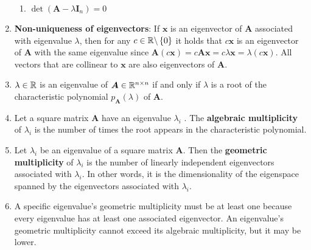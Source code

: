 \begin{enumerate}
\begin{enumerate}
        \item $\det(\bm{A} - \lambda \bm{I}_n) = 0$
        \hfill \cite{mfml/book/mml/Deisenroth-Faisal-Ong}
    \end{enumerate}

    \item \textbf{Non-uniqueness of eigenvectors}: If $\bm{x}$ is an eigenvector of $\bm{A}$ associated with eigenvalue $\lambda$, then for any $c \in \mathbb{R}\backslash \left\{0\right\}$ it holds that $c\bm{x}$ is an eigenvector of $\bm{A}$ with the same eigenvalue since $\bm{A}(c\bm{x}) = c\bm{Ax} = c\lambda\bm{x} = \lambda(c\bm{x})$. All vectors that are collinear to $\bm{x}$ are also eigenvectors of $\bm{A}$.
    \hfill \cite{mfml/book/mml/Deisenroth-Faisal-Ong}

    \item
    \begin{theorem}
        $\lambda  \in \mathbb{R}$ is an eigenvalue of $\bm{A} \in \mathbb{R}^{n\times n}$ if and only if $\lambda$  is a root of the characteristic polynomial $p_{\bm{A}}(\lambda )$ of $\bm{A}$.
        \hfill \cite{mfml/book/mml/Deisenroth-Faisal-Ong}
    \end{theorem}

    \item
    \begin{definition}
        Let a square matrix $\bm{A}$ have an eigenvalue $\lambda_i$ .
        The \textbf{algebraic multiplicity} of $\lambda_i$ is the number of times the root appears in the characteristic polynomial.
        \hfill \cite{mfml/book/mml/Deisenroth-Faisal-Ong}
    \end{definition}

    \item
    \begin{definition}
        Let $\lambda_i$ be an eigenvalue of a square matrix $\bm{A}$.
        Then the \textbf{geometric multiplicity} of $\lambda_i$ is the number of linearly independent eigenvectors associated with $\lambda_i$.
        In other words, it is the dimensionality of the eigenspace spanned by the eigenvectors associated with $\lambda_i$.
        \hfill \cite{mfml/book/mml/Deisenroth-Faisal-Ong}
    \end{definition}

    \item A specific eigenvalue’s geometric multiplicity must be at least one because every eigenvalue has at least one associated eigenvector.
    An eigenvalue’s geometric multiplicity cannot exceed its algebraic multiplicity, but it may be lower.


\end{enumerate}

